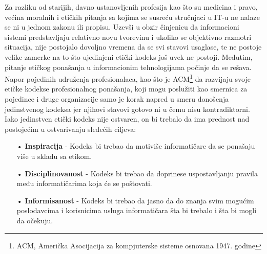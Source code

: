 \documentclass[a4paper]{article}
\begin{document}
{Za razliku od starijih, davno ustanovljenih profesija kao što su medicina i pravo, većina moralnih i etičkih pitanja sa kojima se susreću stručnjaci u IT-u ne nalaze se ni u jednom zakonu ili propisu. Uzevši u obzir činjenicu da informacioni sistemi predstavljaju relativno novu tvorevinu i ukoliko se objektivno razmotri situacija, nije postojalo dovoljno vremena da se svi stavovi usaglase, te ne postoje velike zamerke na to što ujedinjeni etički kodeks još uvek ne postoji. 
Međutim, pitanje etičkog ponašanja u informacionim tehnologijama počinje da se rešava. Napor pojedinih udruženja profesionalaca, kao što je ACM\footnote{ACM, Američka Asocijacija za kompjuterske sisteme osnovana 1947. godine} da razvijaju svoje etičke kodekse profesionalnog ponašanja, koji mogu poslužiti kao smernica za pojedince i druge organizacije samo je korak napred u smeru donošenja jedinstvenog kodeksa jer njihovi stavovi gotovo ni u čemu nisu kontradiktorni.
\\
Iako jedinstven etički kodeks nije ostvaren, on bi trebalo da ima prednost nad postojećim u ostvarivanju sledećih ciljeva:

\begin{itemize}
\item[•] \textbf{Inspiracija} - Kodeks bi trebao da motiviše informatičare da se ponašaju više u skladu sa etikom.
\item[•] \textbf{Disciplinovanost} - Kodeks bi trebao da doprinese uspostavljanju pravila među informatičarima koja će se poštovati.
\item[•] \textbf{Informisanost} - Kodeks bi trebao da jasno da do znanja svim mogućim poslodavcima i korisnicima usluga informatičara šta bi trebalo i šta bi mogli da očekuju.
\end{itemize}

}
\end{document}

